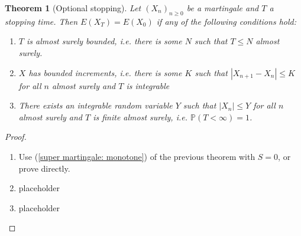 \documentclass[parskip=full]{article}
\newtheorem{theorem}{Theorem}[section]
\theoremstyle{definition}
\newcommand{\Pbb}{\mathbb{P}}
\newcommand{\1}{\mathbbm{1}}
\begin{document}
\begin{theorem}[Optional stopping]
  Let $(X_n)_{n \geq 0}$ be a martingale and $T$ a stopping time. Then $E(X_T) = E(X_0)$ if any of the following conditions hold:
  \begin{enumerate}
    \item $T$ is almost surely bounded, i.e. there is some $N$ such that $T \leq N$ almost surely.
    \item $X$ has bounded increments, i.e. there is some $K$ such that $|X_{n+1} - X_n| \leq K$ for all $n$ almost surely and $T$ is integrable
    \item There exists an integrable random variable $Y$ such that $|X_n| \leq Y$ for all $n$ almost surely and $T$ is finite almost surely, i.e. $\Pbb(T < \infty) = 1$.
  \end{enumerate}
\end{theorem}

\begin{proof}
  \begin{enumerate}
    \item Use (\ref{super martingale: monotone}) of the previous theorem with $S = 0$, or prove directly.
    \item placeholder
    \item placeholder
  \end{enumerate}
\end{proof}
\end{document}
